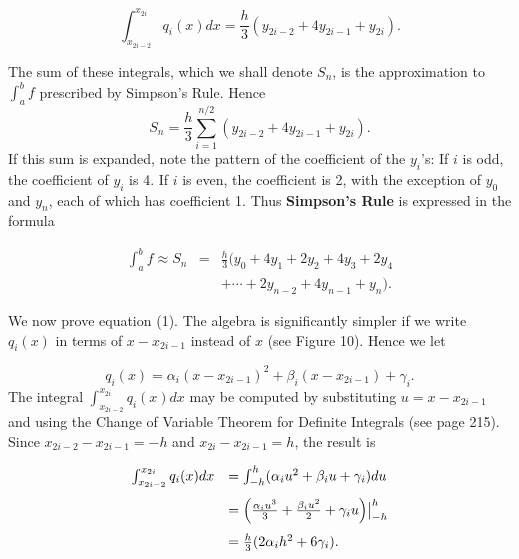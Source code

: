 \begin{equation}
\int_{x_{2i-2}}^{x_{2i}} q_i(x) dx = \frac{h}{3} (y_{2i-2} + 4y_{2i-1} + y_{2i}). 
\label{eq8.3.1}
\end{equation}

\noindent The sum of these integrals, which we shall denote $S_n$, is the approximation to $\int_a^b f$ prescribed by Simpson's Rule. Hence
$$
S_n = \frac{h}{3} \sum_{i=1}^{n/2} (y_{2i-2} + 4y_{2i-1} + y_{2i}) .
$$
\noindent If this sum is expanded, note the pattern of the coefficient of the $y_i$'s: If $i$ is odd, the coefficient of $y_i$ is 4. If $i$ is even, the coefficient is 2, with the exception of $y_0$ and $y_n$, each of which has coefficient 1. Thus \textbf{Simpson's Rule} is expressed in the formula


\begin{theorem} %
\begin{eqnarray*}
\int_a^b f \approx S_n &=& \frac{h}{3} (y_0 + 4y_1 + 2y_2 + 4y_3 + 2y_4\\
&& + \cdots + 2y_{n-2} + 4y_{n-1} + y_n) .
\end{eqnarray*}
\end{theorem}

We now prove equation (1). The algebra is significantly simpler if we write $q_{i}(x)$ in terms of $x - x_{2i-1}$ instead of $x$ (see Figure 10). Hence we let

\begin{equation}
q_i(x) = \alpha_i(x - x_{2i-1})^2 + \beta_i(x- x_{2i-1}) + \gamma_i.  
\label{eq8.3.2}
\end{equation}
\noindent The integral $\int_{x_{2i-2}}^{x_{2i}} q_i (x) dx$ may be computed by substituting $u = x - x_{2i-1}$ and using the Change of Variable Theorem for Definite Integrals (see page 215). Since $x_{2i-2} - x_{2i-1} = - h$ and $x_{2i} - x_{2i-1} = h$, the result is

\begin{equation}
\begin{array}{ll}
\int_{x_{2i-2}}^{x_{2i}} q_i (x) dx 
&= \int_{-h}^h (\alpha_i u^2 + \beta_i u + \gamma_i) du \vspace{.1in}\\
&= \Bigl( \frac{\alpha_i u^3}{3} + \frac{\beta_i u^2}{2} + \gamma_i u \Bigr) \big|_{-h}^h  \vspace{.1in}\\
&= \frac{h}{3} (2\alpha_i h^2 + 6\gamma_i). 
\end{array}
\label{eq8.3.3}
\end{equation}


